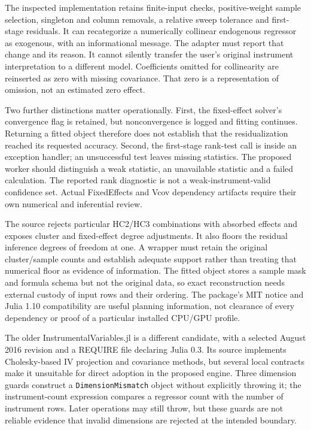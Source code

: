 The inspected implementation retains finite-input checks, positive-weight
sample selection, singleton and column removals, a relative sweep tolerance
and first-stage residuals. It can recategorize a numerically collinear
endogenous regressor as exogenous, with an informational message. The
adapter must report that change and its reason. It cannot silently transfer
the user's original instrument interpretation to a different model.
Coefficients omitted for collinearity are reinserted as zero with missing
covariance. That zero is a representation of omission, not an estimated
zero effect. \citep{exec23_otheriv_source_0}

Two further distinctions matter operationally. First, the fixed-effect
solver's convergence flag is retained, but nonconvergence is logged and
fitting continues. Returning a fitted object therefore does not establish
that the residualization reached its requested accuracy. Second, the
first-stage rank-test call is inside an exception handler; an unsuccessful
test leaves missing statistics. The proposed worker should distinguish a
weak statistic, an unavailable statistic and a failed calculation. The
reported rank diagnostic is not a weak-instrument-valid confidence set.
Actual FixedEffects and Vcov dependency artifacts require their own
numerical and inferential review.
\citep{exec23_otheriv_source_0}

The source rejects particular HC2/HC3 combinations with absorbed effects
and exposes cluster and fixed-effect degree adjustments. It also floors
the residual inference degrees of freedom at one. A wrapper must retain
the original cluster/sample counts and establish adequate support rather
than treating that numerical floor as evidence of information. The fitted
object stores a sample mask and formula schema but not the original data,
so exact reconstruction needs external custody of input rows and their
ordering. The package's MIT notice and Julia 1.10 compatibility are useful
planning information, not clearance of every dependency or proof of a
particular installed CPU/GPU profile.
\citep{exec23_otheriv_source_0}

The older InstrumentalVariables.jl is a different candidate, with a
selected August 2016 revision and a REQUIRE file declaring Julia 0.3. Its
source implements Cholesky-based IV projection and covariance methods,
but several local contracts make it unsuitable for direct adoption in
the proposed engine. Three dimension guards construct a
\texttt{DimensionMismatch} object without explicitly throwing it; the
instrument-count expression compares a regressor count with the number
of instrument rows. Later operations may still throw, but these guards
are not reliable evidence that invalid dimensions are rejected at the
intended boundary.
\citep{exec23_otheriv_source_2}

